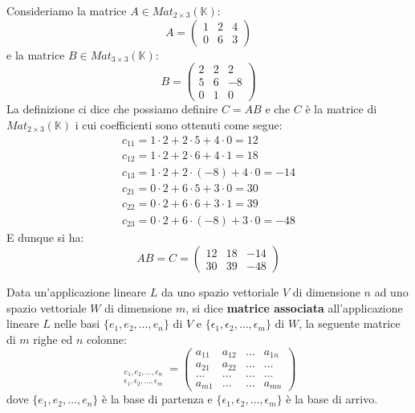 \begin{example}
	Consideriamo la matrice $A \in Mat_{2 \times 3}(\mathbb{K})$:
	\begin{equation*}
		A = \begin{pmatrix}
			1 & 2 & 4 \\
			0 & 6 & 3
		\end{pmatrix}
	\end{equation*}
	e la matrice $B \in Mat_{3 \times 3}(\mathbb{K})$:
	\begin{equation*}
		B = \begin{pmatrix}
			2 & 2 & 2  \\
			5 & 6 & -8 \\
			0 & 1 & 0
		\end{pmatrix}
	\end{equation*}
	La definizione ci dice che possiamo definire $C = AB$ e che $C$ \`e la matrice di
	$Mat_{2 \times 3}(\mathbb{K})$ i cui coefficienti sono ottenuti come segue:
	\begin{gather*}
		c_{11} = 1 \cdot 2 + 2 \cdot 5 + 4 \cdot 0 = 12 \\
		c_{12} = 1 \cdot 2 + 2 \cdot 6 + 4 \cdot 1 = 18 \\
		c_{13} = 1 \cdot 2 + 2 \cdot (-8) + 4 \cdot 0 = -14 \\
		c_{21} = 0 \cdot 2 + 6 \cdot 5 + 3 \cdot 0 = 30 \\
		c_{22} = 0 \cdot 2 + 6 \cdot 6 + 3 \cdot 1 = 39 \\
		c_{23} = 0 \cdot 2 + 6 \cdot (-8) + 3 \cdot 0 = -48
	\end{gather*}
	E dunque si ha:
	\begin{equation*}
		AB = C = \begin{pmatrix}
			12 & 18 & -14 \\
			30 & 39 & -48
		\end{pmatrix}
	\end{equation*}
\end{example}

\begin{defn}
	Data un'applicazione lineare $L$ da uno spazio vettoriale $V$ di
	dimensione $n$ ad uno spazio vettoriale $W$ di dimensione $m$, si dice
	\textbf{matrice associata} all'applicazione lineare $L$ nelle basi
	$\{e_1, e_2, \dots, e_n\}$ di $V$ e
	$\{\epsilon_1, \epsilon_2, \dots, \epsilon_m\}$ di $W$, la seguente
	matrice di $m$ righe ed $n$ colonne:
	\begin{equation*}
		[L]_{\substack{
				e_1, e_2, \dots, e_n\\
				\epsilon_1, \epsilon_2, \dots, \epsilon_m
			}} = \begin{pmatrix}
			a_{11} & a_{12} & \dots & a_{1n} \\
			a_{21} & a_{22} & \dots & \dots  \\
			\dots  & \dots  & \dots & \dots  \\
			a_{m1} & \dots  & \dots & a_{mn}
		\end{pmatrix}
	\end{equation*}
	dove $\{e_1, e_2, \dots, e_n\}$ \`e la base di partenza e
	$\{\epsilon_1, \epsilon_2, \dots, \epsilon_m\}$ \`e la base di arrivo.
\end{defn}

